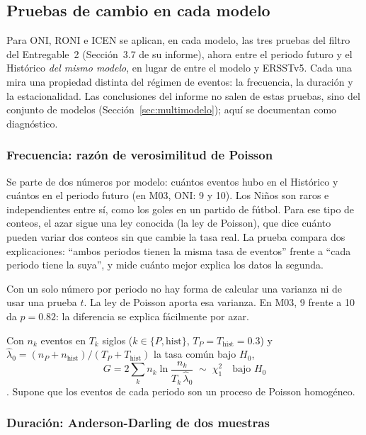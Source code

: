 \documentclass[11pt,a4paper]{article}
\begin{document}
\subsection{Pruebas de cambio en cada modelo}
\label{sec:a_pruebas_modelo}

Para ONI, RONI e ICEN se aplican, en cada modelo, las tres pruebas del filtro del Entregable~2 (Sección~3.7 de su informe), ahora entre el periodo futuro y el Histórico \emph{del mismo modelo}, en lugar de entre el modelo y ERSSTv5.
Cada una mira una propiedad distinta del régimen de eventos: la frecuencia, la duración y la estacionalidad.
Las conclusiones del informe no salen de estas pruebas, sino del conjunto de modelos (Sección~\ref{sec:multimodelo}); aquí se documentan como diagnóstico.

\subsubsection{Frecuencia: razón de verosimilitud de Poisson}

Se parte de dos números por modelo: cuántos eventos hubo en el Histórico y cuántos en el periodo futuro (en M03, ONI: 9 y 10).
Los Niños son raros e independientes entre sí, como los goles en un partido de fútbol.
Para ese tipo de conteos, el azar sigue una ley conocida (la ley de Poisson), que dice cuánto pueden variar dos conteos sin que cambie la tasa real.
La prueba compara dos explicaciones: ``ambos periodos tienen la misma tasa de eventos'' frente a ``cada periodo tiene la suya'', y mide cuánto mejor explica los datos la segunda.

Con un solo número por periodo no hay forma de calcular una varianza ni de usar una prueba $t$.
La ley de Poisson aporta esa varianza.
En M03, 9 frente a 10 da $p = 0.82$: la diferencia se explica fácilmente por azar.

Con $n_k$ eventos en $T_k$ siglos ($k \in \{P, \mathrm{hist}\}$, $T_P = T_{\mathrm{hist}} = 0.3$) y $\hat\lambda_0 = (n_P + n_{\mathrm{hist}})/(T_P + T_{\mathrm{hist}})$ la tasa común bajo $H_0$,
\begin{equation}
\label{eq:lrt}
G = 2\sum_{k} n_k \ln\frac{n_k}{T_k\,\hat\lambda_0} \;\sim\; \chi^2_1 \quad \text{bajo } H_0
\end{equation}
\citep{wilks1938}. Supone que los eventos de cada periodo son un proceso de Poisson homogéneo.

\subsubsection{Duración: Anderson-Darling de dos muestras}
\end{document}
